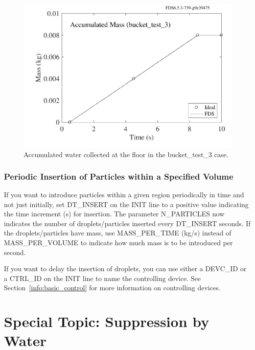 \documentclass[11pt]{book}
\begin{document}
\begin{figure}[ht]
\centering
\includegraphics[scale=0.55]{SCRIPT_FIGURES/bucket_test_3}
\caption[Results of the {\ct bucket\_test\_3} case]{Accumulated water collected at the floor in the {\ct bucket\_test\_3} case.}
\label{bucket_test_3_fig}
\end{figure}

\subsubsection{Periodic Insertion of Particles within a Specified Volume}

If you want to introduce particles within a given region periodically in time and not just initially, set {\ct DT\_INSERT} on
the {\ct INIT} line to a positive value indicating the time increment (s) for insertion. The parameter {\ct N\_PARTICLES} now indicates the
number of droplets/particles inserted every {\ct DT\_INSERT} seconds. If the droplets/particles have mass, use {\ct MASS\_PER\_TIME} (kg/s) instead of {\ct MASS\_PER\_VOLUME} to
indicate how much mass is to be introduced per second.

If you want to delay the insertion of droplets, you can use either a {\ct DEVC\_ID} or a {\ct CTRL\_ID} on the {\ct INIT} line to name the controlling device.
See Section~\ref{info:basic_control} for more information on controlling devices.



\section{Special Topic: Suppression by Water}
\label{info:suppression}
\end{document}
